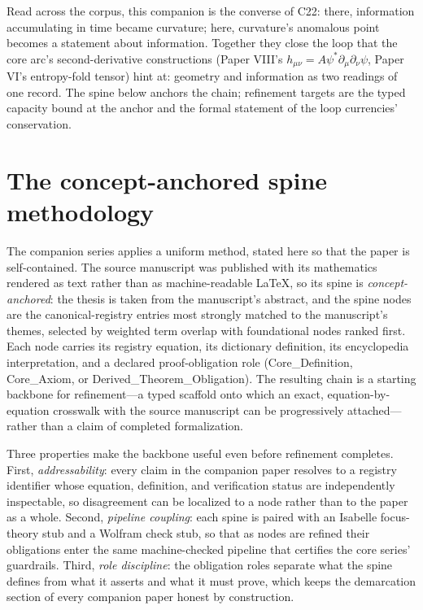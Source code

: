 \documentclass[11pt]{article}
\theoremstyle{remark}
\begin{document}
Read across the corpus, this companion is the converse of C22: there, information accumulating in time became curvature; here, curvature's anomalous point becomes a statement about information. Together they close the loop that the core arc's second-derivative constructions (Paper VIII's $h_{\mu\nu} = A\psi^*\partial_\mu\partial_\nu\psi$, Paper VI's entropy-fold tensor) hint at: geometry and information as two readings of one record. The spine below anchors the chain; refinement targets are the typed capacity bound at the anchor and the formal statement of the loop currencies' conservation.

\section{The concept-anchored spine methodology}
\label{sec:method}

The companion series applies a uniform method, stated here so that the paper is self-contained. The source manuscript was published with its mathematics rendered as text rather than as machine-readable LaTeX, so its spine is \emph{concept-anchored}: the thesis is taken from the manuscript's abstract, and the spine nodes are the canonical-registry entries most strongly matched to the manuscript's themes, selected by weighted term overlap with foundational nodes ranked first. Each node carries its registry equation, its dictionary definition, its encyclopedia interpretation, and a declared proof-obligation role (Core\_Definition, Core\_Axiom, or Derived\_Theorem\_Obligation). The resulting chain is a starting backbone for refinement---a typed scaffold onto which an exact, equation-by-equation crosswalk with the source manuscript can be progressively attached---rather than a claim of completed formalization.

Three properties make the backbone useful even before refinement completes. First, \emph{addressability}: every claim in the companion paper resolves to a registry identifier whose equation, definition, and verification status are independently inspectable, so disagreement can be localized to a node rather than to the paper as a whole. Second, \emph{pipeline coupling}: each spine is paired with an Isabelle focus-theory stub and a Wolfram check stub, so that as nodes are refined their obligations enter the same machine-checked pipeline that certifies the core series' guardrails. Third, \emph{role discipline}: the obligation roles separate what the spine defines from what it asserts and what it must prove, which keeps the demarcation section of every companion paper honest by construction.
\end{document}
